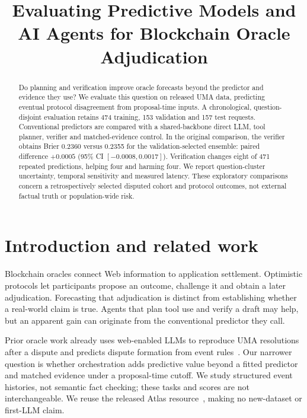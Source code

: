 \documentclass[sigconf,anonymous,review]{acmart}
\title{Evaluating Predictive Models and AI Agents for Blockchain Oracle Adjudication}
\begin{document}
\begin{abstract}
Do planning and verification improve oracle forecasts beyond the predictor and evidence they use? We evaluate this question on released UMA data, predicting eventual protocol disagreement from proposal-time inputs. A chronological, question-disjoint evaluation retains 474 training, 153 validation and 157 test requests. Conventional predictors are compared with a shared-backbone direct LLM, tool planner, verifier and matched-evidence control. In the original comparison, the verifier obtains Brier 0.2360 versus 0.2355 for the validation-selected ensemble: paired difference $+0.0005$ (95\% CI $[-0.0008,0.0017]$). Verification changes eight of 471 repeated predictions, helping four and harming four. \AbstractAblation{} We report question-cluster uncertainty, temporal sensitivity and measured latency. These exploratory comparisons concern a retrospectively selected disputed cohort and protocol outcomes, not external factual truth or population-wide risk.
\end{abstract}
\maketitle
\raggedbottom

\section{Introduction and related work}
Blockchain oracles connect Web information to application settlement. Optimistic protocols let participants propose an outcome, challenge it and obtain a later adjudication. Forecasting that adjudication is distinct from establishing whether a real-world claim is true. Agents that plan tool use and verify a draft may help, but an apparent gain can originate from the conventional predictor they call.

Prior oracle work already uses web-enabled LLMs to reproduce UMA resolutions after a dispute and predicts dispute formation from event rules~\cite{wen2026}. Our narrower question is whether orchestration adds predictive value beyond a fitted predictor and matched evidence under a proposal-time cutoff. We study structured event histories, not semantic fact checking; these tasks and scores are not interchangeable. We reuse the released Atlas resource~\cite{Jia2026OracleAtlas}, making no new-dataset or first-LLM claim.
\end{document}
